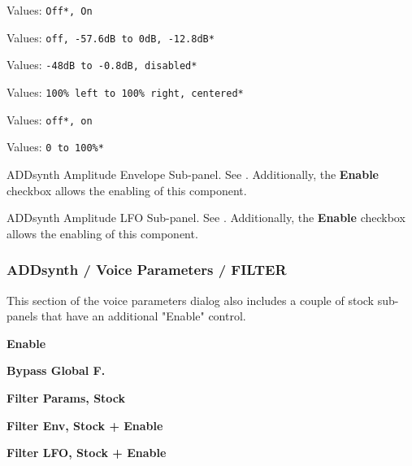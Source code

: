    Values: \texttt{Off*, On}


   Values: \texttt{off, -57.6dB to 0dB, -12.8dB*}


   Values: \texttt{-48dB to -0.8dB, disabled*}


   Values: \texttt{100\% left to 100\% right, centered*}


   Values: \texttt{off*, on}


   Values: \texttt{0 to 100\%* }

   ADDsynth Amplitude Envelope Sub-panel.
   See .
   Additionally, the \textbf{Enable} checkbox allows the enabling of this
   component.

   ADDsynth Amplitude LFO Sub-panel.
   See .
   Additionally, the \textbf{Enable} checkbox allows the enabling of this
   component.

\subsubsection{ADDsynth / Voice Parameters / FILTER}
\label{subsubsec:addsynth_voice_parameters_filter}

   This section of the voice parameters dialog also includes a couple of
   stock sub-panels that have an additional "Enable" control.

   \begin{enumber}
      \item \textbf{Enable}
      \item \textbf{Bypass Global F.}
      \item \textbf{Filter Params, Stock}
      \item \textbf{Filter Env, Stock + Enable}
      \item \textbf{Filter LFO, Stock + Enable}
   \end{enumber}

   \setcounter{ItemCounter}{0}      %

